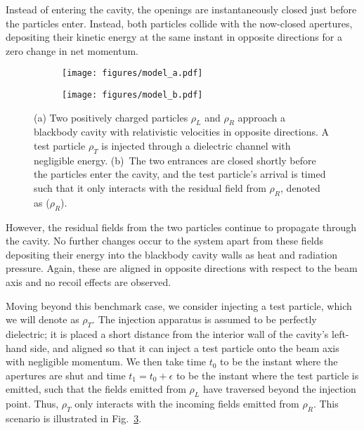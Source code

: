 \documentclass[reprint,
               amsmath,amssymb,nofootinbib, aps%
              ]{revtex4-2}
\begin{document}
Instead of entering the cavity, the openings are instantaneously closed just before the particles enter. Instead, both particles collide with the now-closed apertures, depositing their kinetic energy at the same instant in opposite directions for a zero change in net momentum.

\begin{figure}
  \begin{subfigure}{\columnwidth}
    \centering
    \texttt{[image: figures/model\_a.pdf]}
    \caption{}
    \label{fig:model_setup}
  \end{subfigure}

  \begin{subfigure}{\columnwidth}
    \centering
    \texttt{[image: figures/model\_b.pdf]}
    \caption{}
    \label{fig:model_residuals}
  \end{subfigure}
  \vspace{-1\baselineskip}
  \caption{(a) Two positively charged particles $\rho_L$ and  $\rho_R$ approach a blackbody cavity with relativistic velocities in opposite directions. A test particle $\rho_T$ is injected through a dielectric channel with negligible energy. (b)~The two entrances are closed shortly before the particles enter the cavity, and the test particle's arrival is timed such that it only interacts with the residual field from $\rho_R$, denoted as ($\rho_R$).}
  \label{fig:model_cavity}
\end{figure}

However, the residual fields from the two particles continue to propagate through the cavity. No further changes occur to the system apart from these fields depositing their energy into the blackbody cavity walls as heat and radiation pressure. Again, these are aligned in opposite directions with respect to the beam axis and no recoil effects are observed.

Moving beyond this benchmark case, we consider injecting a test particle, which we will denote as $\rho_{T}$. The injection apparatus is assumed to be perfectly dielectric; it is placed a short distance from the interior wall of the cavity's left-hand side, and aligned so that it can inject a test particle onto the beam axis with negligible momentum. We then take time $t_0$ to be the instant where the apertures are shut and time $t_1=t_0+\epsilon$ to be the instant where the test particle is emitted, such that the fields emitted from $\rho_L$ have traversed beyond the injection point. Thus, $\rho_T$ only interacts with the incoming fields emitted from $\rho_R$. This scenario is illustrated in Fig.~\ref{fig:model_cavity}.
\end{document}
